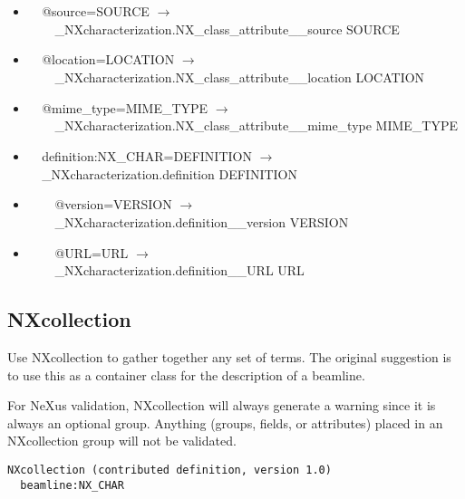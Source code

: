 \documentclass[11pt]{article}
\begin{document}
{{\begin{itemize}
\item{\verb|  |@source=SOURCE $\rightarrow$\\
\verb|    |\_NXcharacterization.NX\_class\_attribute\_\_source SOURCE}

\item{\verb|  |@location=LOCATION $\rightarrow$\\
\verb|    |\_NXcharacterization.NX\_class\_attribute\_\_location LOCATION}

\item{\verb|  |@mime\_type=MIME\_TYPE $\rightarrow$\\
\verb|    |\_NXcharacterization.NX\_class\_attribute\_\_mime\_type MIME\_TYPE}

\item{\verb|  |definition:NX\_CHAR=DEFINITION $\rightarrow$\\
\verb|  |\_NXcharacterization.definition DEFINITION}

\item{\verb|    |@version=VERSION $\rightarrow$\\
\verb|    |\_NXcharacterization.definition\_\_version VERSION}

\item{\verb|    |@URL=URL $\rightarrow$\\
\verb|    |\_NXcharacterization.definition\_\_URL URL}
\end{itemize}
\subsection{NXcollection}

Use NXcollection to gather together any set of terms. The original suggestion is to use this as a container class for the description of a beamline.

For NeXus validation, NXcollection will always generate a warning since it is always an optional group. Anything (groups, fields, or attributes) placed in an NXcollection group will not be validated.

\begin{verbatim}
NXcollection (contributed definition, version 1.0)
  beamline:NX_CHAR
\end{verbatim}

\begin{itemize}


\end{itemize}}}
\end{document}
